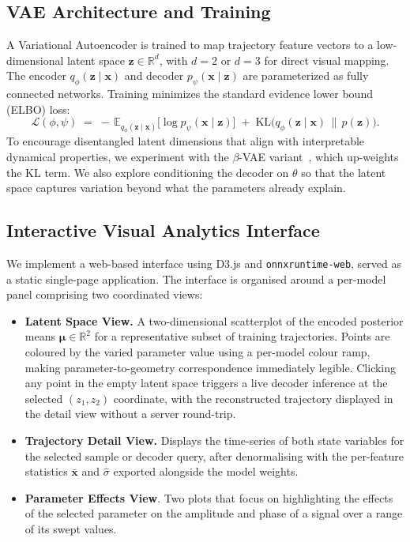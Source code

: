 \documentclass{article}
\begin{document}
\subsection{VAE Architecture and Training}

A Variational Autoencoder is trained to map trajectory feature vectors to a
low-dimensional latent space $\mathbf{z} \in \mathbb{R}^d$, with $d = 2$ or
$d = 3$ for direct visual mapping. The encoder
$q_\phi(\mathbf{z}\mid\mathbf{x})$ and decoder
$p_\psi(\mathbf{x}\mid\mathbf{z})$ are parameterized as fully connected
networks. Training minimizes the standard evidence lower bound (ELBO) loss:
\begin{equation}
    \mathcal{L}(\phi,\psi) \;=\;
    -\,\mathbb{E}_{q_\phi(\mathbf{z}\mid\mathbf{x})}
        \!\bigl[\log p_\psi(\mathbf{x}\mid\mathbf{z})\bigr]
    \;+\;
    \mathrm{KL}\!\bigl(q_\phi(\mathbf{z}\mid\mathbf{x})
        \,\|\, p(\mathbf{z})\bigr).
\end{equation}
To encourage disentangled latent dimensions that align with interpretable
dynamical properties, we experiment with the $\beta$-VAE
variant~\cite{higgins2017betavae}, which up-weights the KL term. We also
explore conditioning the decoder on $\theta$ so that the latent space captures
variation beyond what the parameters already explain.

\subsection{Interactive Visual Analytics Interface}
We implement a web-based interface using D3.js and \texttt{onnxruntime-web},
served as a static single-page application. The interface is organised around
a per-model panel comprising two coordinated views:

\begin{itemize}
    \item \textbf{Latent Space View.} A two-dimensional scatterplot of the
    encoded posterior means $\boldsymbol{\mu} \in \mathbb{R}^2$ for a
    representative subset of training trajectories. Points are coloured by
    the varied parameter value using a per-model colour ramp, making
    parameter-to-geometry correspondence immediately legible. Clicking any
    point in the empty latent space triggers a live decoder inference at
    the selected $(z_1, z_2)$ coordinate, with the reconstructed trajectory
    displayed in the detail view without a server round-trip.

    \item \textbf{Trajectory Detail View.} Displays the time-series of both
    state variables for the selected sample or decoder query, after
    denormalising with the per-feature statistics $\bar{\mathbf{x}}$ and
    $\hat{\sigma}$ exported alongside the model weights.
    \item \textbf{Parameter Effects View}. Two plots that focus on highlighting the effects of the selected parameter on the amplitude and phase of a signal over a range of its swept values.

\end{itemize}
\end{document}
